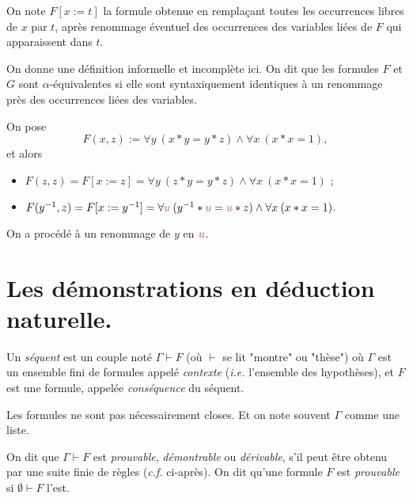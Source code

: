 \documentclass[./main]{subfiles}
\begin{document}
  \begin{defn}[Substitution]
    On note $F[x := t]$ la formule obtenue en remplaçant toutes les occurrences libres de  $x$ par $t$, après renommage éventuel des occurrences des variables liées de $F$ qui apparaissent dans $t$.
  \end{defn}

  \begin{defn}[Renommage]
    On donne une définition informelle et incomplète ici.
    On dit que les formules $F$ et $G$ sont $\alpha$-équivalentes si elle sont syntaxiquement identiques à un renommage près des occurrences liées des variables.
  \end{defn}

  \begin{exm}
    On pose \[
    F(x,z) := \forall y\:(x * y = y * z) \land \forall x\: (x * x = 1)
    ,\]
    et alors 
    \begin{itemize}
      \item $F(z,z) = F[x := z] = \forall y\:(z * y = y * z) \land \forall x\: (x * x = 1)$ ;
      \item $F(y^{-1}, z) = F[x := y^{-1}] = \forall {\color{nicered} u}\:(y^{-1} * {\color{nicered} u} = {\color{nicered} u} * z) \land \forall x\: (x * x = 1)$.
    \end{itemize}
    On a procédé à un renommage de $y$ en ${\color{nicered} u}$.
  \end{exm}

  \section{Les démonstrations en déduction naturelle.}

  \begin{defn}
    Un \textit{séquent} est un couple noté $\Gamma \vdash F$ (où $\vdash$ se lit "montre" ou "thèse") où $\Gamma$ est un ensemble fini de formules appelé \textit{contexte} (\textit{i.e.} l'ensemble des hypothèses), et $F$ est une formule, appelée \textit{conséquence} du séquent.
  \end{defn}

  \begin{rmk}
    Les formules ne sont pas nécessairement closes. Et on note souvent $\Gamma$ comme une liste.
  \end{rmk}

  \begin{defn}
    On dit que $\Gamma \vdash F$ est \textit{prouvable}, \textit{démontrable} ou \textit{dérivable}, s'il peut être obtenu par une suite finie de règles (\textit{c.f.} ci-après).
    On dit qu'une formule $F$ est \textit{prouvable} si $\emptyset\vdash F$ l'est.
  \end{defn}
\end{document}
